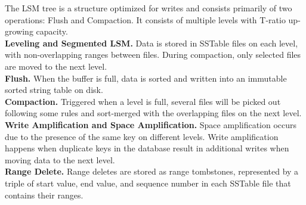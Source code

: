 The LSM tree is a structure optimized for writes and consists primarily of two operations: Flush and Compaction. It consists of multiple levels with T-ratio up-growing capacity.
\\
\textbf{Leveling and Segmented LSM.} Data is stored in SSTable files on each level, with non-overlapping ranges between files. During compaction, only selected files are moved to the next level.
\\
\textbf{Flush.} When the buffer is full, data is sorted and written into an immutable sorted string table on disk.
\\
\textbf{Compaction.} Triggered when a level is full, several files will be picked out following some rules and sort-merged with the overlapping files on the next level.
\\
\textbf{Write Amplification and Space Amplification.} Space amplification occurs due to the presence of the same key on different levels. Write amplification happens when duplicate keys in the database result in additional writes when moving data to the next level.
\\
\textbf{Range Delete.} Range deletes are stored as range tombstones, represented by a triple of start value, end value, and sequence number in each SSTable file that contains their ranges.
